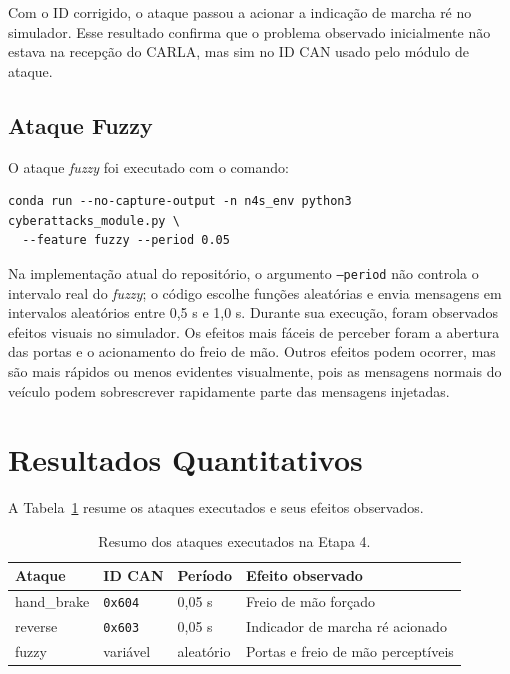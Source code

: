 \documentclass[12pt,a4paper]{article}
\begin{document}
Com o ID corrigido, o ataque passou a acionar a indica\c{c}\~ao de marcha r\'e no
simulador. Esse resultado confirma que o problema observado inicialmente n\~ao estava
na recep\c{c}\~ao do CARLA, mas sim no ID CAN usado pelo m\'odulo de ataque.

\subsection{Ataque Fuzzy}

O ataque \textit{fuzzy} foi executado com o comando:

\begin{verbatim}
conda run --no-capture-output -n n4s_env python3 cyberattacks_module.py \
  --feature fuzzy --period 0.05
\end{verbatim}

Na implementa\c{c}\~ao atual do reposit\'orio, o argumento \texttt{--period} n\~ao controla
o intervalo real do \textit{fuzzy}; o c\'odigo escolhe fun\c{c}\~oes aleat\'orias e envia
mensagens em intervalos aleat\'orios entre 0,5 s e 1,0 s. Durante sua execu\c{c}\~ao,
foram observados efeitos visuais no simulador. Os efeitos mais f\'aceis de perceber foram
a abertura das portas e o acionamento do freio de m\~ao. Outros efeitos podem ocorrer,
mas s\~ao mais r\'apidos ou menos evidentes visualmente, pois as mensagens normais do
ve\'iculo podem sobrescrever rapidamente parte das mensagens injetadas.

\section{Resultados Quantitativos}

A Tabela~\ref{tab:ataques} resume os ataques executados e seus efeitos observados.

\begin{table}[H]
\centering
\caption{Resumo dos ataques executados na Etapa 4.}
\label{tab:ataques}
\begin{tabular}{llll}
\toprule
\textbf{Ataque} & \textbf{ID CAN} & \textbf{Per\'iodo} & \textbf{Efeito observado} \\
\midrule
hand\_brake & \texttt{0x604} & 0,05 s & Freio de m\~ao for\c{c}ado \\
reverse & \texttt{0x603} & 0,05 s & Indicador de marcha r\'e acionado \\
fuzzy & vari\'avel & aleat\'orio & Portas e freio de m\~ao percept\'iveis \\
\bottomrule
\end{tabular}
\end{table}
\end{document}
